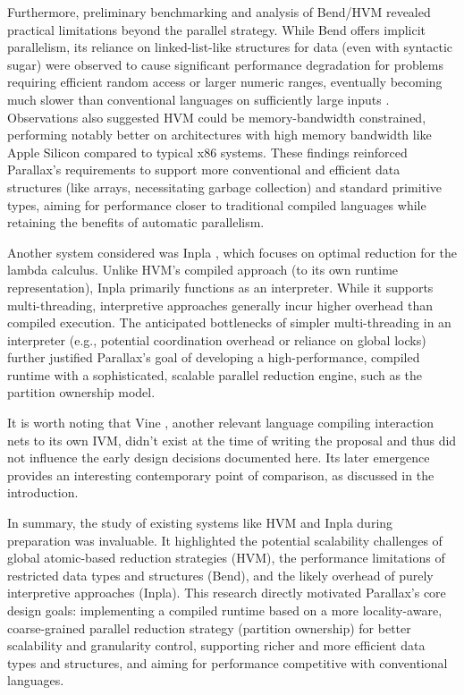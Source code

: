 Furthermore, preliminary benchmarking and analysis of Bend/HVM revealed practical limitations beyond the parallel strategy. While Bend offers implicit parallelism, its reliance on linked-list-like structures for data (even with syntactic sugar) were observed to cause significant performance degradation for problems requiring efficient random access or larger numeric ranges, eventually becoming much slower than conventional languages on sufficiently large inputs \cite{BreakingTheBend}. Observations also suggested HVM could be memory-bandwidth constrained, performing notably better on architectures with high memory bandwidth like Apple Silicon compared to typical x86 systems. These findings reinforced Parallax's requirements to support more conventional and efficient data structures (like arrays, necessitating garbage collection) and standard primitive types, aiming for performance closer to traditional compiled languages while retaining the benefits of automatic parallelism.

Another system considered was Inpla \cite{inpla}, which focuses on optimal reduction for the lambda calculus. Unlike HVM's compiled approach (to its own runtime representation), Inpla primarily functions as an interpreter. While it supports multi-threading, interpretive approaches generally incur higher overhead than compiled execution. The anticipated bottlenecks of simpler multi-threading in an interpreter (e.g., potential coordination overhead or reliance on global locks) further justified Parallax's goal of developing a high-performance, compiled runtime with a sophisticated, scalable parallel reduction engine, such as the partition ownership model.

It is worth noting that Vine \cite{VineGithub}, another relevant language compiling interaction nets to its own IVM, didn't exist at the time of writing the proposal and thus did not influence the early design decisions documented here. Its later emergence provides an interesting contemporary point of comparison, as discussed in the introduction.

In summary, the study of existing systems like HVM and Inpla during preparation was invaluable. It highlighted the potential scalability challenges of global atomic-based reduction strategies (HVM), the performance limitations of restricted data types and structures (Bend), and the likely overhead of purely interpretive approaches (Inpla). This research directly motivated Parallax's core design goals: implementing a compiled runtime based on a more locality-aware, coarse-grained parallel reduction strategy (partition ownership) for better scalability and granularity control, supporting richer and more efficient data types and structures, and aiming for performance competitive with conventional languages.

